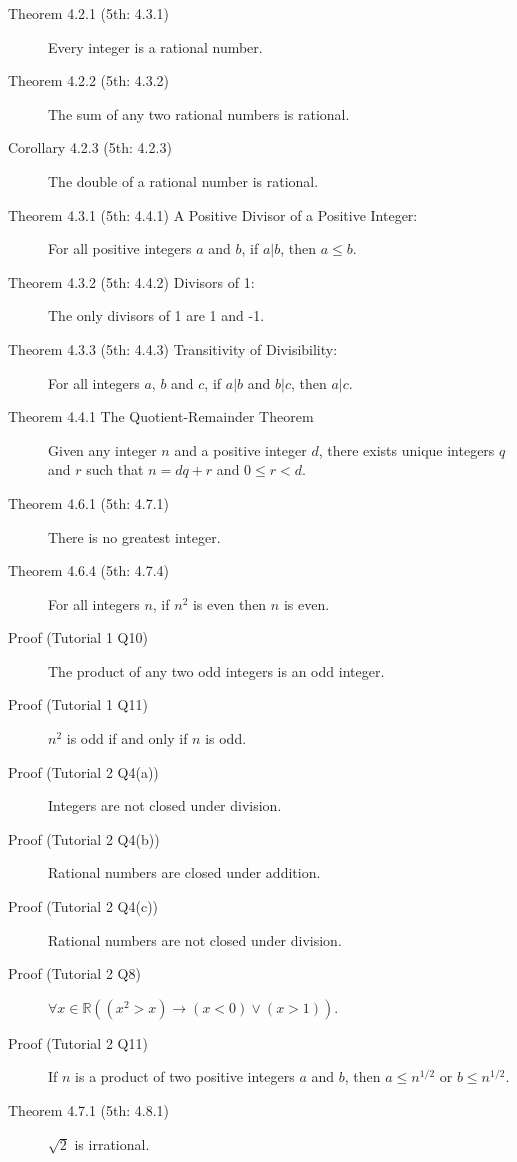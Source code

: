 \documentclass{article}
\begin{document}
\begin{description}
    \item[Theorem 4.2.1 (5th: 4.3.1)] Every integer is a rational number.
    \item[Theorem 4.2.2 (5th: 4.3.2)] The sum of any two rational numbers is rational.
    \item[Corollary 4.2.3 (5th: 4.2.3)] The double of a rational number is rational.
    \item[Theorem 4.3.1 (5th: 4.4.1) A Positive Divisor of a Positive Integer:] For all positive integers $a$ and $b$, if $a|b$, then $a\leq b$. 
    \item[Theorem 4.3.2 (5th: 4.4.2) Divisors of 1:] The only divisors of 1 are 1 and -1.
    \item[Theorem 4.3.3 (5th: 4.4.3) Transitivity of Divisibility:] For all integers $a$, $b$ and $c$, if $a|b$ and $b|c$, then $a|c$. 
    \item[Theorem 4.4.1 The Quotient-Remainder Theorem]Given any integer $n$ and a positive integer $d$, there exists unique integers $q$ and $r$ such that $n=dq+r$ and $0\leq r < d$.
    \item[Theorem 4.6.1 (5th: 4.7.1)] There is no greatest integer.
    \item[Theorem 4.6.4 (5th: 4.7.4)] For all integers $n$, if $n^{2}$ is even then $n$ is even.
    \item[Proof (Tutorial 1 Q10)] The product of any two odd integers is an odd integer.
    \item[Proof (Tutorial 1 Q11)] $n^{2}$ is odd if and only if $n$ is odd.
    \item[Proof (Tutorial 2 Q4(a))]Integers are not closed under division.
    \item[Proof (Tutorial 2 Q4(b))]Rational numbers are closed under addition.
    \item[Proof (Tutorial 2 Q4(c))]Rational numbers are not closed under division.
    \item[Proof (Tutorial 2 Q8)]$\forall x\in \mathbb{R} ((x^{2}>x)\to (x<0)\lor(x>1))$.
    \item[Proof (Tutorial 2 Q11)]If $n$ is a product of two positive integers $a$ and $b$, then $a\leq n^{1/2}$ or $b\leq n^{1/2}$.
    \item[Theorem 4.7.1 (5th: 4.8.1)] $\sqrt{2}$ is irrational.
    

\end{description}
\end{document}
